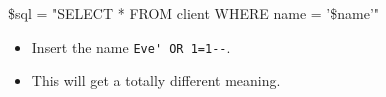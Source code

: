 \documentclass{beamer}
\newcommand{\code}[2][style=code]{\lstinline[#1]`#2`}
\begin{document}

\begin{frame}[fragile]{\insertsubsectionhead}
  \begin{src}
    \$sql = "SELECT * FROM client WHERE name = '\$name'"
  \end{src}
  \begin{itemize}
    \item Insert the name \code{Eve' OR 1=1--}.
    \item This will get a totally different meaning.
  \end{itemize}
\end{frame}


\end{document}
